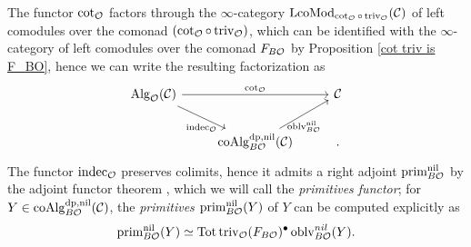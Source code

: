 The functor $\cot_{{\mathcal{O}}}$ factors through the $\infty$-category $\operatorname{LcoMod}_{\cot_{{\mathcal{O}}}\circ \operatorname{triv}_{{\mathcal{O}}}}({\mathcal{C}})$ of left comodules over the comonad $(\cot_{{\mathcal{O}}}\circ \operatorname{triv}_{{\mathcal{O}}})$, which can be identified with the $\infty$-category of left comodules over the comonad $F_{B{\mathcal{O}}}$ by Proposition \ref{cot triv is F_BO}, hence we can write the resulting factorization as
\[
\begin{tikzcd}
     \Alg_{\CO}(\CC) &   & 
     \CC\\
                     & \coAlg^{\divpow, \nil}_{B\CO}(\CC) &
    \arrow[from = 1-1, to = 1-3, "\cot_{\CO}"]
    \arrow[from = 1-1, to = 2-2, "\indec_{\CO}" below, outer sep=3pt]
    \arrow[from = 2-2, to = 1-3, "\oblv_{B\CO}^{\nil}" below, outer sep=3pt].
\end{tikzcd}
\]
The functor $\operatorname{indec}_{{\mathcal{O}}}$ preserves colimits, hence it admits a right adjoint $\operatorname{prim}^{\operatorname{nil}}_{B{\mathcal{O}}}$ by the adjoint functor theorem \cite[Corollary 5.5.2.9.]{HTT}, which we will call the \emph{primitives functor};
for $Y \in \operatorname{coAlg}^{\operatorname{dp}, \operatorname{nil}}_{B{\mathcal{O}}}({\mathcal{C}})$, the \emph{primitives} $\operatorname{prim}_{B{\mathcal{O}}}^{\operatorname{nil}}(Y)$ of $Y$ can be computed explicitly as \cite[Lemma 4.7]  {Heuts_Koszul}
$$
\operatorname{prim}_{B{\mathcal{O}}}^{\operatorname{nil}}(Y) \simeq \operatorname{\operatorname{Tot}} \operatorname{triv}_{{\mathcal{O}}} (F_{B{\mathcal{O}}})^{\bullet} \operatorname{oblv}^{nil}_{B{\mathcal{O}}} (Y).
$$

